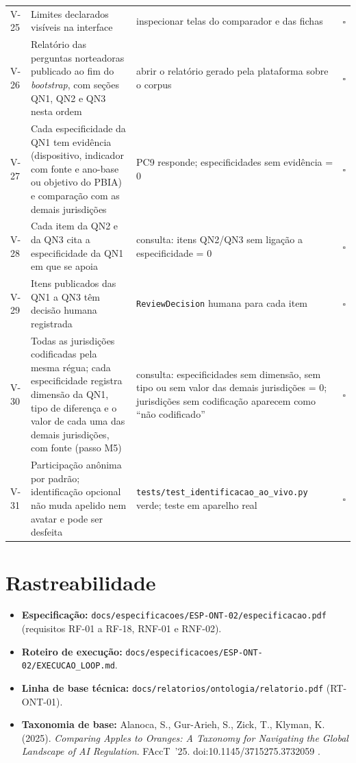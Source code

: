\documentclass[12pt,a4paper,oneside,english,brazil]{abntex2}
\begin{document}
\begin{apendicesenv}
{\begin{longtable}{l >{\raggedright\arraybackslash}p{58mm} >{\raggedright\arraybackslash}p{64mm} c}
V-25 & Limites declarados visíveis na interface & inspecionar telas do comparador e das fichas & $\square$\\
V-26 & Relatório das perguntas norteadoras publicado ao fim do \emph{bootstrap}, com seções QN1, QN2 e QN3 nesta ordem & abrir o relatório gerado pela plataforma sobre o corpus & $\square$\\
V-27 & Cada especificidade da QN1 tem evidência (dispositivo, indicador com fonte e ano-base ou objetivo do PBIA) e comparação com as demais jurisdições & PC9 responde; especificidades sem evidência = 0 & $\square$\\
V-28 & Cada item da QN2 e da QN3 cita a especificidade da QN1 em que se apoia & consulta: itens QN2/QN3 sem ligação a especificidade = 0 & $\square$\\
V-29 & Itens publicados das QN1 a QN3 têm decisão humana registrada & \texttt{ReviewDecision} humana para cada item & $\square$\\
V-30 & Todas as jurisdições codificadas pela mesma régua; cada especificidade registra dimensão da QN1, tipo de diferença e o valor de cada uma das demais jurisdições, com fonte (passo M5) & consulta: especificidades sem dimensão, sem tipo ou sem valor das demais jurisdições = 0; jurisdições sem codificação aparecem como ``não codificado'' & $\square$\\
V-31 & Participação anônima por padrão; identificação opcional não muda apelido nem avatar e pode ser desfeita & \texttt{tests/test\_identificacao\_ao\_vivo.py} verde; teste em aparelho real & $\square$\\
\end{longtable}
}

\chapter{Rastreabilidade}
\begin{itemize}[leftmargin=*]
  \item \textbf{Especificação:} \texttt{docs/especificacoes/ESP-ONT-02/especificacao.pdf} (requisitos RF-01 a RF-18, RNF-01 e RNF-02).
  \item \textbf{Roteiro de execução:} \texttt{docs/especificacoes/ESP-ONT-02/EXECUCAO\_LOOP.md}.
  \item \textbf{Linha de base técnica:} \texttt{docs/relatorios/ontologia/relatorio.pdf} (RT-ONT-01).
  \item \textbf{Taxonomia de base:} Alanoca, S., Gur-Arieh, S., Zick, T., Klyman, K. (2025). \emph{Comparing Apples to Oranges: A Taxonomy for Navigating the Global Landscape of AI Regulation}. FAccT~'25. doi:10.1145/3715275.3732059 \cite{alanoca2025}.
\end{itemize}
\end{apendicesenv}
\end{document}
